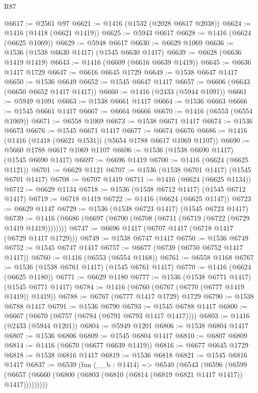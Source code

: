\begin{lexlean}{R87}
\begin{coremodule}
{{@6617 := @2561 @97
@6621 := @1416 (@1532 (@2028 @6617 @2038))
@6624 := @1416 (@1418 (@6621 @1419))
@6625 := @5943 @6617
@6628 := @1416 (@6624 (@6625 @1069))
@6629 := @5948 @6617
@6630 := @6629 @1069
@6636 := @1536 (@1538 @6630 @1417) (@1545 @6630 @1417)
@6639 := @6628 (@6636 @1419 @1419)
@6643 := @1416 (@6609 (@6616 @6639 @1419))
@6645 := @6636 @1417 @1729
@6647 := @6616 @6645 @1729
@6649 := @1538 @6647 @1417
@6650 := @1536 @6649
@6652 := @1545 @6647 @1417
@6657 := @6606 (@6643 (@6650 @6652 @1417 @1417))
@6660 := @1416 (@2433 (@5944 @1091))
@6661 := @5949 @1091
@6663 := @1538 @6661 @1417
@6664 := @1536 @6663
@6666 := @1545 @6661 @1417
@6667 := @6664 @6666
@6670 := @1416 (@6553 (@6554 @1069))
@6671 := @6558 @1069
@6673 := @1538 @6671 @1417
@6674 := @1536 @6673
@6676 := @1545 @6671 @1417
@6677 := @6674 @6676
@6686 := @1416 (@1416 (@1418 (@6621 @1531)) (@5654 @1788 @6617 @1069 @1107))
@6690 := @5660 @1788 @6617 @1069 @1107
@6696 := @1536 (@1538 @6690 @1417) (@1545 @6690 @1417)
@6697 := @6696 @1419
@6700 := @1416 (@6624 (@6625 @1121))
@6701 := @6629 @1121
@6707 := @1536 (@1538 @6701 @1417) (@1545 @6701 @1417)
@6708 := @6707 @1419
@6711 := @1416 (@6624 (@6625 @1134))
@6712 := @6629 @1134
@6718 := @1536 (@1538 @6712 @1417) (@1545 @6712 @1417)
@6719 := @6718 @1419
@6722 := @1416 (@6624 (@6625 @1147))
@6723 := @6629 @1147
@6729 := @1536 (@1538 @6723 @1417) (@1545 @6723 @1417)
@6739 := @1416 (@6686 (@6697 (@6700 (@6708 (@6711 (@6719 (@6722 (@6729 @1419 @1419))))))))
@6747 := @6696 @1417 (@6707 @1417 (@6718 @1417 (@6729 @1417 @1729)))
@6749 := @1538 @6747 @1417
@6750 := @1536 @6749
@6752 := @1545 @6747 @1417
@6757 := @6677 (@6739 (@6750 @6752 @1417 @1417))
@6760 := @1416 (@6553 (@6554 @1168))
@6761 := @6558 @1168
@6767 := @1536 (@1538 @6761 @1417) (@1545 @6761 @1417)
@6770 := @1416 (@6624 (@6625 @1180))
@6771 := @6629 @1180
@6777 := @1536 (@1538 @6771 @1417) (@1545 @6771 @1417)
@6784 := @1416 (@6760 (@6767 (@6770 (@6777 @1419 @1419)) @1419))
@6788 := @6767 (@6777 @1417 @1729) @1729
@6790 := @1538 @6788 @1417
@6791 := @1536 @6790
@6793 := @1545 @6788 @1417
@6800 := @6667 (@6670 (@6757 (@6784 (@6791 @6793 @1417 @1417))))
@6803 := @1416 (@2433 (@5944 @1201))
@6804 := @5949 @1201
@6806 := @1538 @6804 @1417
@6807 := @1536 @6806
@6809 := @1545 @6804 @1417
@6810 := @6807 @6809
@6814 := @1416 (@6670 (@6677 @6639 @1419))
@6816 := @6677 @6645 @1729
@6818 := @1538 @6816 @1417
@6819 := @1536 @6818
@6821 := @1545 @6816 @1417
@6837 := @6539
    (fun (__b : @1414) =>
    @6540
      (@6543
        (@6596
          (@6599 (@6657 (@6660 (@6800 (@6803 (@6810 (@6814 (@6819 @6821 @1417 @1417)) @1417)))))))))
}}
\end{coremodule}
\end{lexlean}
